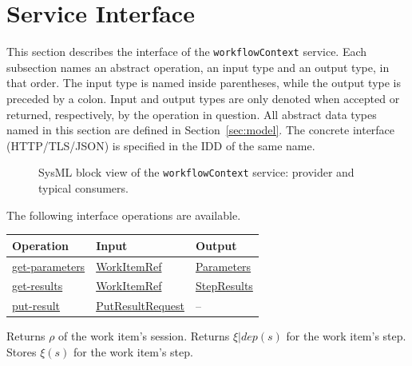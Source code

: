 \documentclass[a4paper]{arrowhead}
\newcommand{\mref}[1]{{\textcolor{ArrowheadPurple}{\hyperref[sec:model:#1]{#1}}}}
\newcommand{\oref}[1]{{\textcolor{ArrowheadBlue}{\hyperref[sec:operations:#1]{#1}}}}
\begin{document}
\newpage
\section{Service Interface}
\label{sec:operations}
This section describes the interface of the \texttt{workflowContext} service. Each subsection names an abstract operation,
an input type and an output type, in that order. The input type is named inside parentheses, while the output type is
preceded by a colon. Input and output types are only denoted when accepted or returned, respectively, by the operation
in question. All abstract data types named in this section are defined in Section~\ref{sec:model}. The concrete
interface (HTTP/TLS/JSON) is specified in the IDD of the same name.

\begin{figure}[ht!]
  \centering
  \caption{SysML block view of the \texttt{workflowContext} service: provider and typical consumers.}
  \label{fig:SD}
\end{figure}

The following interface operations are available.

{\small
\begin{longtable}{|p{4.4cm}|p{5.6cm}|p{5.8cm}|}

\hline
\rowcolor{gray!33} Operation & Input & Output \\ \hline
\endhead
\oref{get-parameters} & \mref{WorkItemRef} & \mref{Parameters} \\ \hline
\oref{get-results} & \mref{WorkItemRef} & \mref{StepResults} \\ \hline
\oref{put-result} & \mref{PutResultRequest} & -- \\ \hline
\end{longtable}
}

Returns $\rho$ of the work item's session.
Returns $\xi|dep(s)$ for the work item's step.
Stores $\xi(s)$ for the work item's step.
\end{document}
